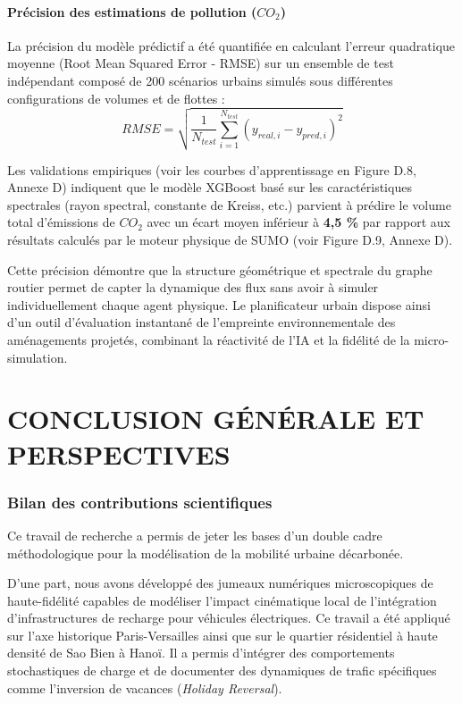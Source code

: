 \documentclass[10pt, a4paper]{article}
\begin{document}
\paragraph{\texorpdfstring{Précision des estimations de pollution
(\(CO_2\))}{Précision des estimations de pollution (CO\_2)}}\label{pruxe9cision-des-estimations-de-pollution-co_2}

La précision du modèle prédictif a été quantifiée en calculant l'erreur
quadratique moyenne (Root Mean Squared Error - RMSE) sur un ensemble de
test indépendant composé de 200 scénarios urbains simulés sous
différentes configurations de volumes et de flottes :
\[RMSE = \sqrt{\frac{1}{N_{test}} \sum_{i=1}^{N_{test}} \left( y_{real, i} - y_{pred, i} \right)^2}\]

Les validations empiriques (voir les courbes d'apprentissage en Figure
D.8, Annexe D) indiquent que le modèle XGBoost basé sur les
caractéristiques spectrales (rayon spectral, constante de Kreiss, etc.)
parvient à prédire le volume total d'émissions de \(CO_2\) avec un écart
moyen inférieur à \textbf{4,5 \%} par rapport aux résultats calculés par
le moteur physique de SUMO (voir Figure D.9, Annexe D).

Cette précision démontre que la structure géométrique et spectrale du
graphe routier permet de capter la dynamique des flux sans avoir à
simuler individuellement chaque agent physique. Le planificateur urbain
dispose ainsi d'un outil d'évaluation instantané de l'empreinte
environnementale des aménagements projetés, combinant la réactivité de
l'IA et la fidélité de la micro-simulation.

\newpage

\section{CONCLUSION GÉNÉRALE ET
PERSPECTIVES}\label{conclusion-guxe9nuxe9rale-et-perspectives}

\subsubsection{Bilan des contributions
scientifiques}\label{bilan-des-contributions-scientifiques}

Ce travail de recherche a permis de jeter les bases d'un double cadre
méthodologique pour la modélisation de la mobilité urbaine décarbonée.

D'une part, nous avons développé des jumeaux numériques microscopiques
de haute-fidélité capables de modéliser l'impact cinématique local de
l'intégration d'infrastructures de recharge pour véhicules électriques.
Ce travail a été appliqué sur l'axe historique Paris-Versailles ainsi
que sur le quartier résidentiel à haute densité de Sao Bien à Hanoï. Il
a permis d'intégrer des comportements stochastiques de charge et de
documenter des dynamiques de trafic spécifiques comme l'inversion de
vacances (\emph{Holiday Reversal}).
\end{document}
